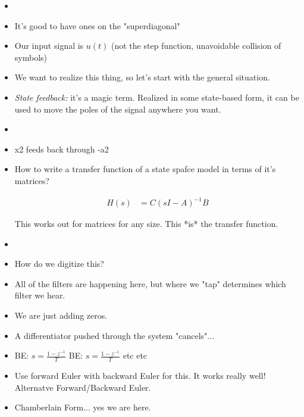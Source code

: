 \begin{itemize}
\item{
}
\item{
It's good to have ones on the "superdiagonal" 
}
\item{
Our input signal is $u(t)$ (not the step function, unavoidable collision of symbols)
}
\item{
We want to realize this thing, so let's start with the general situation. 
}
\item{
    \textit{State feedback:} it's a magic term. Realized in some state-based form, 
    it can be used to move the poles of the signal anywhere you want. 
}
\item{
}
\item{
    x2 feeds back through -a2
}
\item{
    How to write a transfer function of a state spafce model in terms of it's matrices?

    \begin{align*}
        H(s) &= C(sI - A)^{-1}B
    \end{align*}

    This works out for matrices for any size. This *is* the transfer function. 
}
\item{
}
\item{
    How do we digitize this? 
}
\item{
    All of the filters are happening here, but where we "tap" determines
which filter we hear. 
}
\item{
    We are just adding zeros. 
}
\item{
    A differentiator pushed through the system "cancels"... 
}
\item{
    BE: $s = \frac{1 - z^{-1}}{T} $
    BE: $s = \frac{1 - z^{-1}}{T} $
    etc etc 
}
\item{
    Use forward Euler with backward Euler for this. It works really well!
    Alternatve Forward/Backward Euler.
}
\item{
    Chamberlain Form... yes we are here.
}
\end{itemize}
